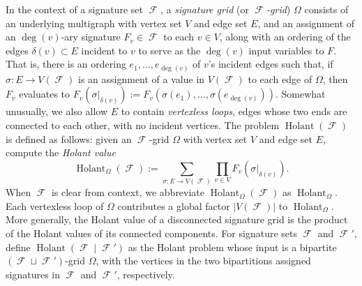\documentclass{article}
\theoremstyle{remark}
\theoremstyle{definition}
\DeclareMathOperator{\fc}{\mathcal{F}}
\DeclareMathOperator{\holant}{Holant}
\begin{document}
In the context of a signature set $\fc$, a
\emph{signature grid} (or \emph{$\fc$-grid}) $\Omega$ consists of an underlying multigraph with 
vertex set $V$ and edge set $E$, and an assignment of an $\deg(v)$-ary signature $F_v \in \fc$ 
to each $v \in V$, along with an ordering of the edges $\delta(v) \subset E$ incident to $v$ 
to serve as the
$\deg(v)$ input variables to $F$. That is, there is an ordering $e_1,\ldots,e_{\deg(v)}$ of $v$'s 
incident edges such that, if $\sigma: E \to V(\fc)$ is an assignment of a value in $V(\fc)$ to each
edge of $\Omega$, then $F_v$ evaluates to 
$F_v(\sigma|_{\delta(v)}) := F_v(\sigma(e_1),\ldots,\sigma(e_{\deg(v)}))$.
Somewhat unusually, we also allow $E$ to contain \emph{vertexless loops}, edges whose two ends are 
connected to each other, with no incident vertices.
The problem $\holant(\fc)$ is defined as follows: given an $\fc$-grid $\Omega$
with vertex set $V$ and edge set $E$, compute the \emph{Holant value}
\begin{equation}
    \holant_\Omega(\fc) := \sum_{\sigma: E \to V(\fc)} \prod_{v \in V} F_v(\sigma|_{\delta(v)}).
    \label{eq:holant}
\end{equation}
When $\fc$ is clear from context, we abbreviate $\holant_\Omega(\fc)$ as 
$\holant_\Omega$. Each vertexless loop of $\Omega$ contributes a global factor $|V(\fc)|$ to
$\holant_\Omega$. More generally, the Holant value of a disconnected signature grid
is the product of the Holant values of its connected components.
For signature sets $\fc$ and $\fc'$, define $\holant(\fc \mid \fc')$ as the Holant problem 
whose input is a bipartite $(\fc\sqcup\fc')$-grid 
$\Omega$, with the vertices in the two bipartitions assigned signatures in $\fc$ and $\fc'$,
respectively.
\end{document}
